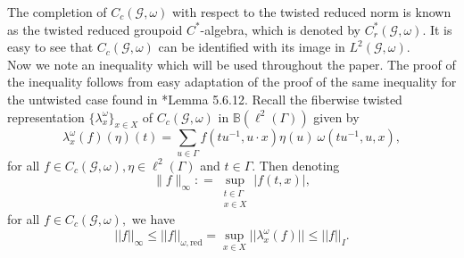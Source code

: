 \documentclass[a4paper,11pt,reqno]{amsart}
\theoremstyle{plain}
\newtheorem{thm}{Theorem}[section]
\theoremstyle{mainthmstyle}
\theoremstyle{named}
\numberwithin{equation}{section}
\begin{document}
The completion of $C_c (\mathcal G, \omega)$ with respect to the twisted reduced norm is known as the twisted reduced groupoid $C^{\ast}$-algebra, which is denoted by $C_r^{\ast} (\mathcal G, \omega).$ It is easy to see that $C_c (\mathcal G, \omega)$ can be identified with its image in $L^2 (\mathcal G, \omega).$\\
Now we note an inequality which will be used throughout the paper. The proof of the inequality follows from easy adaptation of the proof of the same inequality for the untwisted case found in \cite{brownc}*{Lemma 5.6.12}. Recall the fiberwise twisted representation $\{\lambda^{\omega}_{x}\}_{x\in X}$ of $C_{c}(\mathcal{G},\omega)$ in $\mathbb{B}(\ell^{2}(\Gamma))$ given by 
\begin{displaymath}
    \lambda^{\omega}_x (f) (\eta) (t) = \sum\limits_{u \in \Gamma} f \left (t u^{-1}, u \cdot x \right ) \eta (u)\ \omega \left (t u^{-1}, u, x \right ),
\end{displaymath}
 for all $f \in C_c (\mathcal G, \omega), \eta \in \ell^{2} (\Gamma)$ and $t \in \Gamma.$ Then denoting $$\|f\|_{\infty} : = \sup\limits_{\substack {t \in \Gamma \\ x \in X}} \left \lvert f (t, x) \right \rvert,$$ for all $f \in C_c (\mathcal G, \omega),$ we have
 \begin{equation}\label{I-n0rm dominance}
     \lvert\lvert f\rvert\rvert_{\infty}\leq \lvert\lvert f\rvert\rvert_{\omega,\mathrm{red}}=\sup\limits_{x\in X}\lvert\lvert\lambda^{\omega}_{x}(f)\rvert\rvert\leq\lvert\lvert f\rvert\rvert_{I}.
 \end{equation}
\end{document}
